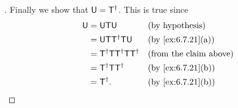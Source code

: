 \begin{proof}[]
  Finally we show that \(\mathsf{U} = \mathsf{T}^{\dag}\).
  This is true since
  \begin{align*}
    \U & = \U \T \U                            &  & \text{(by hypothesis)}        \\
       & = \U \T \T^{\dag} \T \U               &  & \by{ex:6.7.21}[a]             \\
       & = \T^{\dag} \T \T^{\dag} \T \T^{\dag} &  & \text{(from the claim above)} \\
       & = \T^{\dag} \T \T^{\dag}              &  & \by{ex:6.7.21}[b]             \\
       & = \T^{\dag}.                          &  & \by{ex:6.7.21}[b]
  \end{align*}
\end{proof}

\begin{ex}\label{ex:6.7.23}
\end{ex}
